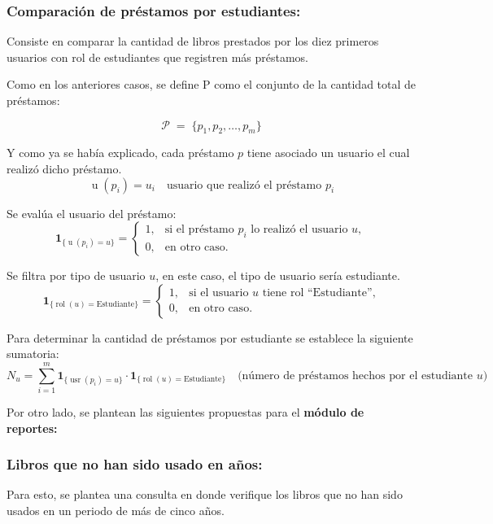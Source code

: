\documentclass[spanish]{ieee_upb}
\begin{document}
\subsubsection{Comparación de préstamos por estudiantes: }

Consiste en comparar la cantidad de libros prestados por los diez primeros usuarios con rol de estudiantes que registren más préstamos. 

Como en los anteriores casos, se define P como el conjunto de la cantidad total de préstamos:

\[
  \mathcal{P}\;=\;\{
      p_1,p_2,\dots,p_m
  \}
\]

Y como ya se había explicado, cada préstamo \(p\) tiene asociado un usuario el cual realizó dicho préstamo.
\[
  \operatorname{u}(p_i)
  = u_i
  \quad\text{usuario que realizó el préstamo }p_i
\]
 
Se evalúa el usuario del préstamo:
\[
  \mathbf 1_{\{\operatorname{u}(p_i)=u\}}
  = 
  \begin{cases}
    1, & \text{si el préstamo }p_i\text{ lo realizó el usuario }u,\\[4pt]
    0, & \text{en otro caso.}
  \end{cases}
\]

Se filtra por tipo de usuario \(u\), en este caso, el tipo de usuario sería estudiante.
\[
  \mathbf 1_{\{\operatorname{rol}(u)=\text{Estudiante}\}}
  =
  \begin{cases}
    1, & \text{si el usuario }u\text{ tiene rol “Estudiante”,}\\[4pt]
    0, & \text{en otro caso.}
  \end{cases}
\]

Para determinar la cantidad de préstamos por estudiante se establece la siguiente sumatoria: 
\[
  N_{u}
  =
  \sum_{i=1}^{m}
     \mathbf 1_{\{\operatorname{usr}(p_i)=u\}}
     \cdot
     \mathbf 1_{\{\operatorname{rol}(u)=\text{Estudiante}\}}
  \quad
  \bigl(\text{número de préstamos hechos por el estudiante }u\bigr)
\]

\vspace{0.3cm}
Por otro lado, se plantean las siguientes propuestas para el \textbf{módulo de reportes:}

\subsubsection{Libros que no han sido usado en años: }Para esto, se plantea una consulta en donde verifique los libros que no han sido usados en un periodo de más de cinco años.
\end{document}
